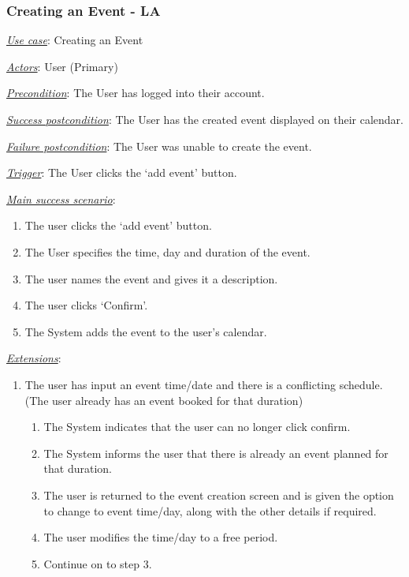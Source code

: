 \documentclass[a4paper]{article}
\begin{document}
\subsubsection{Creating an Event - LA}
\underline{\textit{Use case}}: Creating an Event

\underline{\textit{Actors}}: User (Primary)

\underline{\textit{Precondition}}: The User has logged into their account.

\underline{\textit{Success postcondition}}: The User has the created event displayed on their calendar.

\underline{\textit{Failure postcondition}}: The User was unable to create the event.

\underline{\textit{Trigger}}: The User clicks the ‘add event’ button.

\underline{\textit{Main success scenario}}: 
\begin{enumerate}[leftmargin = 3em]
    \item The user clicks the ‘add event’ button.
    \item The User specifies the time, day and duration of the event.
    \item The user names the event and gives it a description.
    \item The user clicks ‘Confirm’.
    \item The System adds the event to the user’s calendar.
\end{enumerate} 

\underline{\textit{Extensions}}:
\begin{enumerate}[label=2\alph*, leftmargin = 3em]
    \item The user has input an event time/date and there is a conflicting schedule. (The user already has an event booked for that duration) \begin{enumerate}[label=\arabic*.]
        \item The System indicates that the user can no longer click confirm.
        \item The System informs the user that there is already an event planned for that duration.
        \item The user is returned to the event creation screen and is given the option to change to event time/day, along with the other details if required.
        \item The user modifies the time/day to a free period.
        \item Continue on to step 3.
    \end{enumerate}
\end{enumerate}
\end{document}
